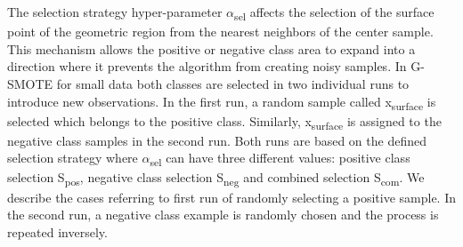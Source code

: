 \documentclass[parskip=full]{scrartcl}
\begin{document}
The selection strategy hyper-parameter $\alpha$\textsubscript{sel} affects the selection of the surface 
point of the geometric region from the nearest neighbors of the center sample. This mechanism allows 
the positive or negative class area to expand into a direction where it prevents the algorithm from 
creating noisy samples. In G-SMOTE for small data both classes are selected in two individual runs to 
introduce new observations. In the first run, a random sample called x\textsubscript{surface} is selected 
which belongs to the positive class. Similarly, x\textsubscript{surface} is assigned to the negative class 
samples in the second run. Both runs are based on the defined selection strategy where 
$\alpha$\textsubscript{sel} can have three different values: positive class selection 
S\textsubscript{pos}, negative class selection S\textsubscript{neg} and combined selection 
S\textsubscript{com}. We describe the cases referring to first run of randomly selecting a positive 
sample. In the second run, a negative class example is randomly chosen and the process is repeated 
inversely. 
\end{document}
